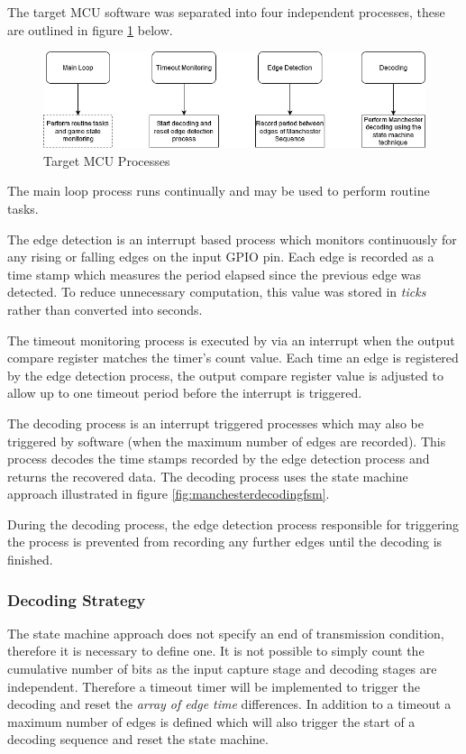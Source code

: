 The target MCU software was separated into four independent processes, these are outlined in figure \ref{fig:target_software_overview} below.

\begin{figure}[H]
	\centering
	\includegraphics[width=0.8\linewidth]{figures/design/target_software_overview.png}
	\caption{Target MCU Processes}
	\label{fig:target_software_overview}
\end{figure}

The main loop process runs continually and may be used to perform routine tasks.

The edge detection is an interrupt based process which monitors continuously for any rising or falling edges on the input GPIO pin. Each edge is recorded as a time stamp which measures the period elapsed since the previous edge was detected. To reduce unnecessary computation, this value was stored in \textit{ticks} rather than converted into seconds.

The timeout monitoring process is executed by via an interrupt when the output compare register matches the timer's count value. Each time an edge is registered by the edge detection process, the output compare register value is adjusted to allow up to one timeout period before the interrupt is triggered.

The decoding process is an interrupt triggered processes which may also be triggered by software (when the maximum number of edges are recorded). This process decodes the time stamps recorded by the edge detection process and returns the recovered data. The decoding process uses the state machine approach illustrated in figure \ref{fig:manchesterdecodingfsm}.

During the decoding process, the edge detection process responsible for triggering the process is prevented from recording any further edges until the decoding is finished.

\subsubsection{Decoding Strategy}

The state machine approach does not specify an end of transmission condition, therefore it is necessary to define one. It is not possible to simply count the cumulative number of bits as the input capture stage and decoding stages are independent. Therefore a timeout timer will be implemented to trigger the decoding and reset the \textit{array of edge time} differences. In addition to a timeout a maximum number of edges is defined which will also trigger the start of a decoding sequence and reset the state machine.

